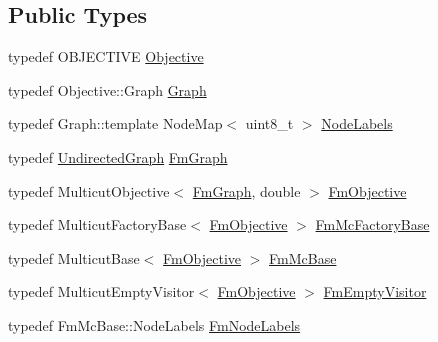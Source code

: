 \subsection*{Public Types}
\begin{DoxyCompactItemize}
\item 
typedef O\+B\+J\+E\+C\+T\+I\+V\+E \hyperlink{classnifty_1_1graph_1_1optimization_1_1common_1_1FusionMove_a2d9b8d0416bdb17557df7bafbac7d792}{Objective}
\item 
typedef Objective\+::\+Graph \hyperlink{classnifty_1_1graph_1_1optimization_1_1common_1_1FusionMove_a846b143ce9fbf252bf6c7771dc1b52b9}{Graph}
\item 
typedef Graph\+::template Node\+Map$<$ uint8\+\_\+t $>$ \hyperlink{classnifty_1_1graph_1_1optimization_1_1common_1_1FusionMove_acf0358608c8cd6f9506b50a850584751}{Node\+Labels}
\item 
typedef \hyperlink{classnifty_1_1graph_1_1UndirectedGraph}{Undirected\+Graph} \hyperlink{classnifty_1_1graph_1_1optimization_1_1common_1_1FusionMove_ab601d24bfed6306838a770dd33bc8d20}{Fm\+Graph}
\item 
typedef Multicut\+Objective$<$ \hyperlink{classnifty_1_1graph_1_1optimization_1_1common_1_1FusionMove_ab601d24bfed6306838a770dd33bc8d20}{Fm\+Graph}, double $>$ \hyperlink{classnifty_1_1graph_1_1optimization_1_1common_1_1FusionMove_a608f76fd662b686f32396b5a252b2f98}{Fm\+Objective}
\item 
typedef Multicut\+Factory\+Base$<$ \hyperlink{classnifty_1_1graph_1_1optimization_1_1common_1_1FusionMove_a608f76fd662b686f32396b5a252b2f98}{Fm\+Objective} $>$ \hyperlink{classnifty_1_1graph_1_1optimization_1_1common_1_1FusionMove_a6af63b2ed662deb28c716c462669cb37}{Fm\+Mc\+Factory\+Base}
\item 
typedef Multicut\+Base$<$ \hyperlink{classnifty_1_1graph_1_1optimization_1_1common_1_1FusionMove_a608f76fd662b686f32396b5a252b2f98}{Fm\+Objective} $>$ \hyperlink{classnifty_1_1graph_1_1optimization_1_1common_1_1FusionMove_ad1c985b457ead4c14a19d262a54e3c7d}{Fm\+Mc\+Base}
\item 
typedef Multicut\+Empty\+Visitor$<$ \hyperlink{classnifty_1_1graph_1_1optimization_1_1common_1_1FusionMove_a608f76fd662b686f32396b5a252b2f98}{Fm\+Objective} $>$ \hyperlink{classnifty_1_1graph_1_1optimization_1_1common_1_1FusionMove_a1f340052bf0329363ef6513d2216d0bf}{Fm\+Empty\+Visitor}
\item 
typedef Fm\+Mc\+Base\+::\+Node\+Labels \hyperlink{classnifty_1_1graph_1_1optimization_1_1common_1_1FusionMove_a6a9b4fbe94395033bb21da945f181d71}{Fm\+Node\+Labels}
\end{DoxyCompactItemize}
